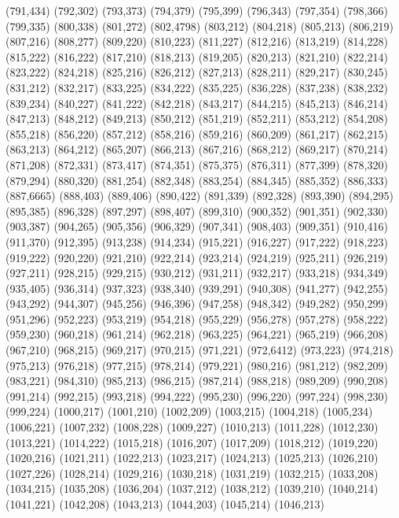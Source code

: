 (791,434)
(792,302)
(793,373)
(794,379)
(795,399)
(796,343)
(797,354)
(798,366)
(799,335)
(800,338)
(801,272)
(802,4798)
(803,212)
(804,218)
(805,213)
(806,219)
(807,216)
(808,277)
(809,220)
(810,223)
(811,227)
(812,216)
(813,219)
(814,228)
(815,222)
(816,222)
(817,210)
(818,213)
(819,205)
(820,213)
(821,210)
(822,214)
(823,222)
(824,218)
(825,216)
(826,212)
(827,213)
(828,211)
(829,217)
(830,245)
(831,212)
(832,217)
(833,225)
(834,222)
(835,225)
(836,228)
(837,238)
(838,232)
(839,234)
(840,227)
(841,222)
(842,218)
(843,217)
(844,215)
(845,213)
(846,214)
(847,213)
(848,212)
(849,213)
(850,212)
(851,219)
(852,211)
(853,212)
(854,208)
(855,218)
(856,220)
(857,212)
(858,216)
(859,216)
(860,209)
(861,217)
(862,215)
(863,213)
(864,212)
(865,207)
(866,213)
(867,216)
(868,212)
(869,217)
(870,214)
(871,208)
(872,331)
(873,417)
(874,351)
(875,375)
(876,311)
(877,399)
(878,320)
(879,294)
(880,320)
(881,254)
(882,348)
(883,254)
(884,345)
(885,352)
(886,333)
(887,6665)
(888,403)
(889,406)
(890,422)
(891,339)
(892,328)
(893,390)
(894,295)
(895,385)
(896,328)
(897,297)
(898,407)
(899,310)
(900,352)
(901,351)
(902,330)
(903,387)
(904,265)
(905,356)
(906,329)
(907,341)
(908,403)
(909,351)
(910,416)
(911,370)
(912,395)
(913,238)
(914,234)
(915,221)
(916,227)
(917,222)
(918,223)
(919,222)
(920,220)
(921,210)
(922,214)
(923,214)
(924,219)
(925,211)
(926,219)
(927,211)
(928,215)
(929,215)
(930,212)
(931,211)
(932,217)
(933,218)
(934,349)
(935,405)
(936,314)
(937,323)
(938,340)
(939,291)
(940,308)
(941,277)
(942,255)
(943,292)
(944,307)
(945,256)
(946,396)
(947,258)
(948,342)
(949,282)
(950,299)
(951,296)
(952,223)
(953,219)
(954,218)
(955,229)
(956,278)
(957,278)
(958,222)
(959,230)
(960,218)
(961,214)
(962,218)
(963,225)
(964,221)
(965,219)
(966,208)
(967,210)
(968,215)
(969,217)
(970,215)
(971,221)
(972,6412)
(973,223)
(974,218)
(975,213)
(976,218)
(977,215)
(978,214)
(979,221)
(980,216)
(981,212)
(982,209)
(983,221)
(984,310)
(985,213)
(986,215)
(987,214)
(988,218)
(989,209)
(990,208)
(991,214)
(992,215)
(993,218)
(994,222)
(995,230)
(996,220)
(997,224)
(998,230)
(999,224)
(1000,217)
(1001,210)
(1002,209)
(1003,215)
(1004,218)
(1005,234)
(1006,221)
(1007,232)
(1008,228)
(1009,227)
(1010,213)
(1011,228)
(1012,230)
(1013,221)
(1014,222)
(1015,218)
(1016,207)
(1017,209)
(1018,212)
(1019,220)
(1020,216)
(1021,211)
(1022,213)
(1023,217)
(1024,213)
(1025,213)
(1026,210)
(1027,226)
(1028,214)
(1029,216)
(1030,218)
(1031,219)
(1032,215)
(1033,208)
(1034,215)
(1035,208)
(1036,204)
(1037,212)
(1038,212)
(1039,210)
(1040,214)
(1041,221)
(1042,208)
(1043,213)
(1044,203)
(1045,214)
(1046,213)
